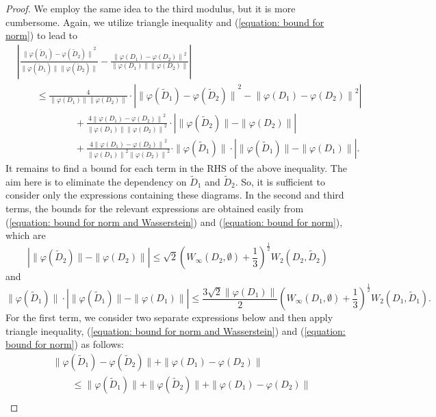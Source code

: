 \documentclass[sn-mathphys-num]{sn-jnl}%
\theoremstyle{thmstyleone}%
\theoremstyle{thmstyletwo}%
\theoremstyle{thmstylethree}%
\begin{document}
\begin{proof}
	We employ the same idea to the third modulus, but it is more cumbersome. Again, we utilize triangle inequality and (\ref{equation: bound for norm}) to lead to
	\begin{align*}
		&\left|\frac{{\|\varphi(\tilde{D}_1)-\varphi(\tilde{D}_2)\|}^2}{\|\varphi(\tilde{D}_1)\|\|\varphi(\tilde{D}_2)\|}-\frac{{\|\varphi(D_1)-\varphi(D_2)\|}^2}{\|\varphi(D_1)\|\|\varphi(D_2)\|}\right| \\
		&\qquad \leq \frac{4}{\|\varphi(D_1)\|\|\varphi(D_2)\|} \cdot \left|{\|\varphi(\tilde{D}_1)-\varphi(\tilde{D}_2)\|}^2 - {\|\varphi(D_1)-\varphi(D_2)\|}^2 \right|\\
		&\qquad \qquad \qquad + \frac{4\left\|\varphi(D_1)-\varphi(D_2)\right\|^2}{\|\varphi(D_1)\|{\|\varphi(D_2)\|}^2} \cdot \left|\|\varphi(\tilde{D}_2)\|- \|\varphi(D_2)\| \right| \\
		&\qquad \qquad \qquad + \frac{4\left\|\varphi(D_1)-\varphi(D_2)\right\|^2}{{\|\varphi(D_1)\|}^2{\|\varphi(D_2)\|}^2} \cdot \|\varphi(\tilde{D}_1)\| \cdot \left|\|\varphi(\tilde{D}_1)\|- \|\varphi(D_1)\| \right|.
	\end{align*}
	It remains to find a bound for each term in the RHS of the above inequality. The aim here is to eliminate the dependency on $\tilde{D}_1$ and $\tilde{D}_2$. So, it is sufficient to consider only the expressions containing these diagrams. In the second and third terms, the bounds for the relevant expressions are obtained easily from (\ref{equation: bound for norm and Wasserstein}) and (\ref{equation: bound for norm}), which are
	\begin{equation*}
		\left|\|\varphi(\tilde{D}_2)\|- \|\varphi(D_2)\| \right| \leq \sqrt{2} \left(W_{\infty}(D_2, \emptyset)+\frac{1}{3}\right)^{\frac{1}{2}} W_2(D_2, \tilde{D}_2)
	\end{equation*}
	and
	\begin{equation*}
		\|\varphi(\tilde{D}_1)\| \cdot \left|\|\varphi(\tilde{D}_1)\|- \|\varphi(D_1)\| \right| \leq \frac{3 \sqrt{2} \left\|\varphi(D_1)\right\|}{2}\left(W_{\infty}(D_1, \emptyset)+\frac{1}{3}\right)^{\frac{1}{2}} W_2(D_1, \tilde{D}_1).
	\end{equation*}
	For the first term, we consider two separate expressions below and then apply triangle inequality, (\ref{equation: bound for norm and Wasserstein}) and (\ref{equation: bound for norm}) as follows:
	\begin{align*}
		& \|\varphi(\tilde{D}_1)-\varphi(\tilde{D}_2)\|+\|\varphi(D_1)-\varphi(D_2)\| \\
		& \qquad \leq \|\varphi(\tilde{D}_1)\|+\|\varphi(\tilde{D}_2)\|+\|\varphi(D_1)-\varphi(D_2)\| \\

\end{align*}
\end{proof}
\end{document}
